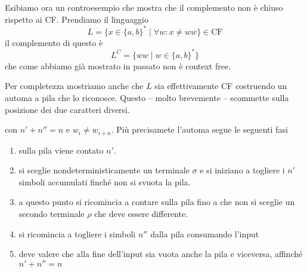 \documentclass[12pt]{report}
\theoremstyle{definition}
\begin{document}
\begin{tcolorbox}[breakable]
	Esibiamo ora un controesempio che mostra che il complemento non è chiuso rispetto ai CF.
	Prendiamo il linguaggio
	$$ L = \{ x \in \{a, b\}^* \mid \forall w : x \neq w w \} \in \text{CF} $$
	il complemento di questo è
	$$ L^C = \{ w w \mid w \in \{a, b\}^* \} $$
	che come abbiamo già mostrato in passato non è context free.	%

	Per completezza mostriamo anche che $L$ sia effettivamente CF costruendo un automa a pila che lo riconosce.
	Questo -- molto brevemente -- scommette sulla posizione dei due caratteri diversi.
	\begin{center}
	\end{center}
	con $n' + n'' = n$ e $w_i \neq w_{i + n}$.
	Più precisamete l'automa segue le seguenti fasi
	\begin{enumerate}
		\item sulla pila viene contato $n'$.
		\item si sceglie nondeterministicamente un terminale $\sigma$ e si iniziano a togliere i $n'$ simboli accumulati finché non si svuota la pila.
		\item a questo punto si ricomincia a contare sulla pila fino a che non si sceglie un secondo terminale $\rho$ che deve essere differente.
		\item si ricomincia a togliere i simboli $n''$ dalla pila consumando l'input
		\item deve valere che alla fine dell'input sia vuota anche la pila e viceversa, affinché $n' + n'' = n$
	\end{enumerate}
\end{tcolorbox}
\end{document}
